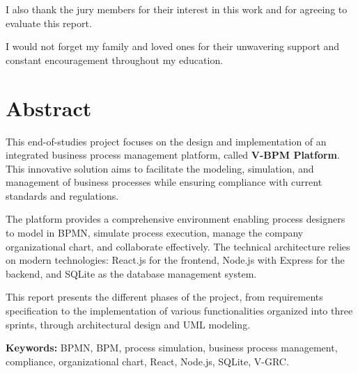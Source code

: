 I also thank the jury members for their interest in this work and for agreeing to evaluate this report.

I would not forget my family and loved ones for their unwavering support and constant encouragement throughout my education.

\newpage

\chapter*{Abstract}

This end-of-studies project focuses on the design and implementation of an integrated business process management platform, called \textbf{V-BPM Platform}. This innovative solution aims to facilitate the modeling, simulation, and management of business processes while ensuring compliance with current standards and regulations.

The platform provides a comprehensive environment enabling process designers to model in BPMN, simulate process execution, manage the company organizational chart, and collaborate effectively. The technical architecture relies on modern technologies: React.js for the frontend, Node.js with Express for the backend, and SQLite as the database management system.

This report presents the different phases of the project, from requirements specification to the implementation of various functionalities organized into three sprints, through architectural design and UML modeling.

\vspace{0.5cm}
\textbf{Keywords:} BPMN, BPM, process simulation, business process management, compliance, organizational chart, React, Node.js, SQLite, V-GRC.

\newpage

\tableofcontents
\newpage

\listoffigures
\newpage

\listoftables
\newpage
